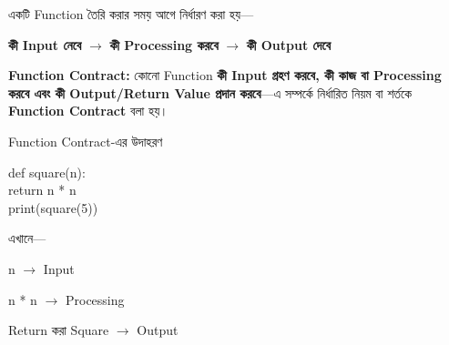 
একটি Function তৈরি করার সময় আগে নির্ধারণ করা হয়—

\begin{center}

\textbf{কী Input নেবে}
\(\longrightarrow\)
\textbf{কী Processing করবে}
\(\longrightarrow\)
\textbf{কী Output দেবে}

\end{center}

\begin{definitionbox}

\textbf{Function Contract:}
কোনো Function \textbf{কী Input গ্রহণ করবে, কী কাজ বা Processing করবে
এবং কী Output/Return Value প্রদান করবে}—এ সম্পর্কে নির্ধারিত নিয়ম বা
শর্তকে \textbf{Function Contract} বলা হয়।

\end{definitionbox}


\begin{codeoutputbox}{Function Contract-এর উদাহরণ}

\noindent
\begin{minipage}[t]{0.53\linewidth}
\codeheading

\begin{english}
\ttfamily
def square(n):\\
\hspace*{4mm}return n * n\\[0.5mm]
print(square(5))
\end{english}

\end{minipage}
\hfill
\begin{minipage}[t]{0.43\linewidth}
\outputheading

\begin{center}
\textenglish{}
\end{center}

এখানে—

\textenglish{\ttfamily n}
\(\longrightarrow\)
Input

\medskip

\textenglish{\ttfamily n * n}
\(\longrightarrow\)
Processing

\medskip

Return করা Square
\(\longrightarrow\)
Output

\end{minipage}

\end{codeoutputbox}

